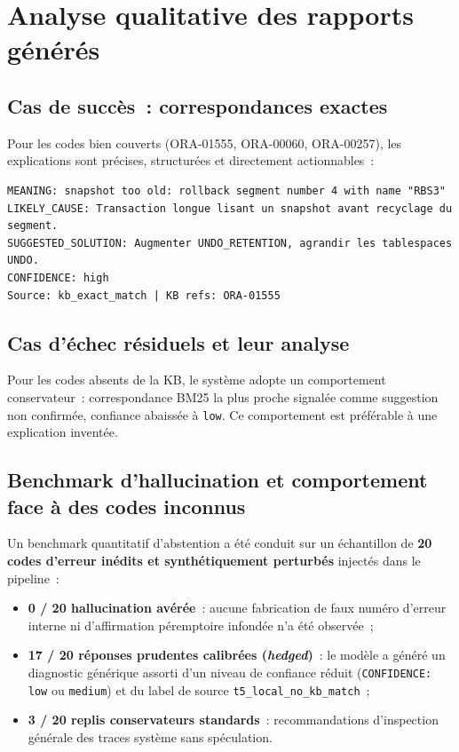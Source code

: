 \documentclass[12pt,a4paper]{report}
\begin{document}
\section{Analyse qualitative des rapports g\'en\'er\'es}
\label{sec:qualitatif}

\subsection{Cas de succ\`es~: correspondances exactes}

Pour les codes bien couverts (ORA-01555, ORA-00060, ORA-00257), les explications
sont pr\'ecises, structur\'ees et directement actionnables~:

\begin{lstlisting}[language={},caption={Extrait de rapport pour ORA-01555},label=lst:report_example]
MEANING: snapshot too old: rollback segment number 4 with name "RBS3"
LIKELY_CAUSE: Transaction longue lisant un snapshot avant recyclage du segment.
SUGGESTED_SOLUTION: Augmenter UNDO_RETENTION, agrandir les tablespaces UNDO.
CONFIDENCE: high
Source: kb_exact_match | KB refs: ORA-01555
\end{lstlisting}

\subsection{Cas d'\'echec r\'esiduels et leur analyse}

Pour les codes absents de la KB, le syst\`eme adopte un comportement conservateur~:
correspondance BM25 la plus proche signal\'ee comme \og{}suggestion non confirm\'ee\fg{},
confiance abaiss\'ee \`a \texttt{low}. Ce comportement est pr\'ef\'erable \`a une
explication invent\'ee.

\subsection{Benchmark d'hallucination et comportement face \`a des codes inconnus}

Un benchmark quantitatif d'abstention a \'et\'e conduit sur un \'echantillon de
\textbf{20 codes d'erreur in\'edits et synth\'etiquement perturb\'es} inject\'es dans le pipeline~:
\begin{itemize}[leftmargin=*]
  \item \textbf{0 / 20 hallucination av\'er\'ee}~: aucune fabrication de faux num\'ero d'erreur
        interne ni d'affirmation p\'eremptoire infond\'ee n'a \'et\'e observ\'ee~;
  \item \textbf{17 / 20 r\'eponses prudentes calibr\'ees (\emph{hedged})}~: le mod\`ele a
        g\'en\'er\'e un diagnostic g\'en\'erique assorti d'un niveau de confiance r\'eduit
        (\texttt{CONFIDENCE: low} ou \texttt{medium}) et du label de source
        \texttt{t5\_local\_no\_kb\_match}~;
  \item \textbf{3 / 20 replis conservateurs standards}~: recommandations d'inspection
        g\'en\'erale des traces syst\`eme sans sp\'eculation.
\end{itemize}
\end{document}
